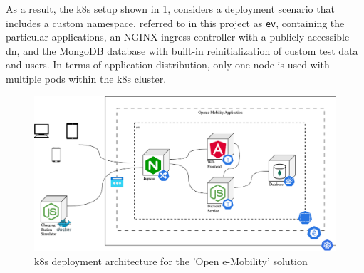 As a result, the \acrshort{k8s} setup shown in \ref{fig:k8s-setup}, considers a deployment scenario that includes a custom namespace, referred to in this project as \verb|ev|, containing the particular applications, an NGINX ingress controller with a publicly accessible \acrshort{dn}, and the MongoDB database with built-in reinitialization of custom test data and users.
In terms of application distribution, only one node is used with multiple pods within the \acrshort{k8s} cluster.

\begin{figure}[!ht]
    \centering
    \includegraphics[scale=0.4]{resources/images/main/3_approach/KubernetesDeployment.png}
    \caption{\acrshort{k8s} deployment architecture for the 'Open e-Mobility' \cite{noauthor_open_2023} solution}
    \label{fig:k8s-setup}
\end{figure}
